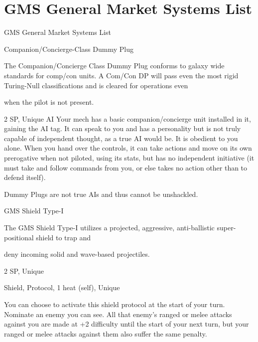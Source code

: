 \section{GMS General Market Systems List}
                                GMS General Market Systems List

Companion/Concierge-Class Dummy Plug

The Companion/Concierge Class Dummy Plug conforms to galaxy wide standards for comp/con units. A
Com/Con DP will pass even the most rigid Turing-Null classifications and is cleared for operations even

when the pilot is not present.

2 SP, Unique
AI
Your mech has a basic companion/concierge unit installed in it, gaining the AI tag. It can speak
to you and has a personality but is not truly capable of independent thought, as a true AI would
be. It is obedient to you alone. When you hand over the controls, it can take actions and move
on its own prerogative when not piloted, using its stats, but has no independent initiative (it must
take and follow commands from you, or else takes no action other than to defend itself).


Dummy Plugs are not true AIs and thus cannot be unshackled.


GMS Shield Type-I

The GMS Shield Type-I utilizes a projected, aggressive, anti-ballistic super-positional shield to trap and

deny incoming solid and wave-based projectiles.


2 SP, Unique

Shield, Protocol, 1 heat (self), Unique





You can choose to activate this shield protocol at the start of your turn. Nominate an enemy you
can see. All that enemy’s ranged or melee attacks against you are made at +2 difficulty until the
start of your next turn, but your ranged or melee attacks against them also suffer the same
penalty.